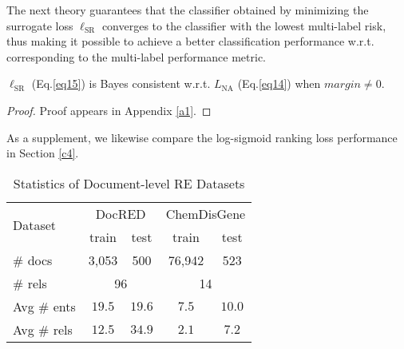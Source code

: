 \documentclass[11pt]{article}
\begin{document}
The next theory guarantees that the classifier obtained by minimizing the surrogate loss $\ell_{\mathrm{SR}}$ converges to the classifier with the lowest multi-label risk, thus making it possible to achieve a better classification performance w.r.t. corresponding to the multi-label performance metric.

\begin{thm}\label{thm2}
$\ell_{\mathrm{SR}}$ (Eq.\ref{eq15}) is Bayes consistent w.r.t. $L_{\mathrm{NA}}$ (Eq.\ref{eq14}) when $margin \neq 0$.
\end{thm} 
\begin{proof}
Proof appears in Appendix \ref{a1}.
\end{proof}

As a supplement, we likewise compare the log-sigmoid ranking loss performance in Section \ref{c4}.

\begin{table}
\centering
\begin{tabular}{lcccc}
\hline \multirow{2}{*}{ Dataset } & \multicolumn{2}{c}{DocRED} & \multicolumn{2}{c}{ChemDisGene} \\
 & train & test & train & test \\
\hline 
\# docs & 3,053 & 500 & 76,942 & 523 \\
\# rels & \multicolumn{2}{c}{96} & \multicolumn{2}{c}{14} \\
Avg \# ents & $19.5$ & $19.6$ & $7.5$ & $10.0$ \\
Avg \# rels & $12.5$ & $34.9$ & $2.1$ & $7.2$ \\
\hline
\end{tabular}
\caption{ Statistics of Document-level RE Datasets}
\label{tab:accents1}
\end{table}
\end{document}
